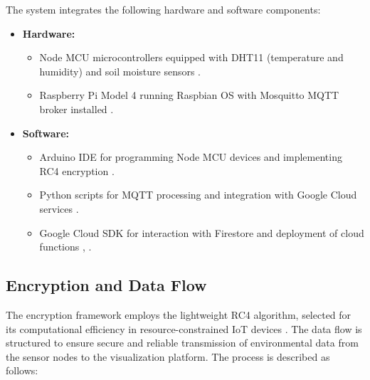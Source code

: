 \documentclass[journal]{Definitions/mdpi}
\begin{document}
The system integrates the following hardware and software components:

\begin{itemize}
    \item \textbf{Hardware:}
    \begin{itemize}
        \item Node MCU microcontrollers equipped with DHT11 (temperature and humidity) and soil moisture sensors \cite{ref-journal2}.
        \item Raspberry Pi Model 4 running Raspbian OS with Mosquitto MQTT broker installed \cite{ref-conference2}.
    \end{itemize}
    \item \textbf{Software:}
    \begin{itemize}
        \item Arduino IDE for programming Node MCU devices and implementing RC4 encryption \cite{ref-journal2}.
        \item Python scripts for MQTT processing and integration with Google Cloud services \cite{ref-cloud3}.
        \item Google Cloud SDK for interaction with Firestore and deployment of cloud functions \cite{ref-cloud1}, \cite{ref-cloud3}.
    \end{itemize}
\end{itemize}

\subsection{Encryption and Data Flow}

The encryption framework employs the lightweight RC4 algorithm, selected for its computational efficiency in resource-constrained IoT devices \cite{ref-journal2}. The data flow is structured to ensure secure and reliable transmission of environmental data from the sensor nodes to the visualization platform. The process is described as follows:
\end{document}
